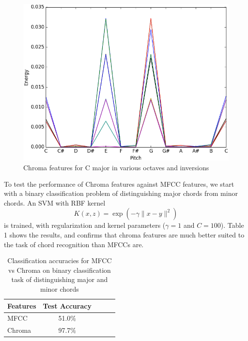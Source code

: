 \documentclass{article}
\begin{document}
\begin{figure}[ht]
\vskip 0.2in
\begin{center}
\centerline{\includegraphics[width=\columnwidth]{chromac}}
\caption{Chroma features for C major in various octaves and inversions}
\label{icml-historical}
\end{center}
\vskip -0.2in
\end{figure}


To test the performance of Chroma features against MFCC features, we start with a binary classification problem of distinguishing major chords from minor chords. An SVM with RBF kernel $$ K(x, z) = \exp(-\gamma\lVert{x - y}\rVert^2)$$ is trained, with regularization and kernel parameters ($\gamma = 1$ and $C = 100$). Table 1 shows the results, and confirms that chroma features are much better suited to the task of chord recognition than MFCCs are.
\begin{table}[t]
\caption{Classification accuracies for MFCC vs Chroma on binary classification task of distinguishing major and minor chords}
\label{mfccvschroma}
\vskip 0.15in
\begin{center}
\begin{small}
\begin{sc}
\begin{tabular}{lcccr}
\hline
\abovespace\belowspace
Features & Test Accuracy \\
\hline
\abovespace
MFCC    & 51.0\%\\
Chroma & 97.7\%\\
\hline
\end{tabular}
\end{sc}
\end{small}
\end{center}
\vskip -0.1in
\end{table}
\end{document}
